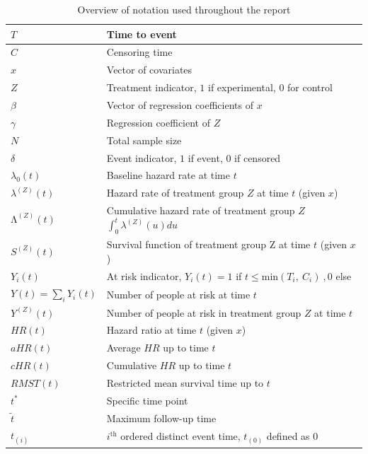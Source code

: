 \begin{table}[H]  
    \caption{Overview of notation used throughout the report}
    \label{tab:notation}
    \begin{tabular}{|p{1.7in}|p{2.6in}|} \hline 
$T$ & Time to event \\ \hline 
$C$ & Censoring time \\ \hline 
$x$ & Vector of covariates \\ \hline 
$Z$ & Treatment indicator, $1$ if experimental, $0$ for control \\ \hline 
$\beta $ & Vector of regression coefficients of $x$ \\ \hline 
$\gamma $ & Regression coefficient of $Z$ \\ \hline 
$N$ & Total sample size \\ \hline 
$\delta $  & Event indicator, $1$ if event, $0$ if censored \\ \hline 
${\lambda }_0(t)$  & Baseline hazard rate at time $t$ \\ \hline 
${\lambda }^{\left(Z\right)}(t)$  & Hazard rate of treatment group $Z$ at time $t$ (given $x$) \\ \hline 
${\mathrm{\Lambda }}^{\left(Z\right)}(t)$ & Cumulative hazard rate of treatment group $Z$ $\int^t_0{{\lambda }^{\left(Z\right)}(u)du}$ \\ \hline 
$S^{\left(Z\right)}(t)$  & Survival function of treatment group Z at time $t$ (given $x$) \\ \hline 
$Y_i\left(t\right)$ & At risk indicator, $Y_i\left(t\right)=1$ if $t\le {\mathrm{min} \left(T_i,\ C_i\right)\ },0$ else  \\ \hline 
$Y\left(t\right)=\sum_i{Y_i(t)}$ & Number of people at risk at time $t$ \\ \hline 
$Y^{(Z)}(t)$ & Number of people at risk in treatment group $Z$ at time $t$ \\ \hline 
$HR(t)$ & Hazard ratio at time $t$ (given $x$) \\ \hline 
$aHR(t)$ & Average $HR$ up to time $t$ \\ \hline 
$cHR(t)$ & Cumulative $HR$ up to time $t$ \\ \hline 
$RMST(t)$ & Restricted mean survival time up to $t$ \\ \hline 
$t^*$ & Specific time point \\ \hline 
$\tilde{t}$ & Maximum follow-up time \\ \hline 
$t_{\left(i\right)}$ & $i^{\text{th}}$ ordered distinct event time, $t_{\left(0\right)}$ defined as 0 \\ \hline 
\end{tabular}
    
\end{table}

